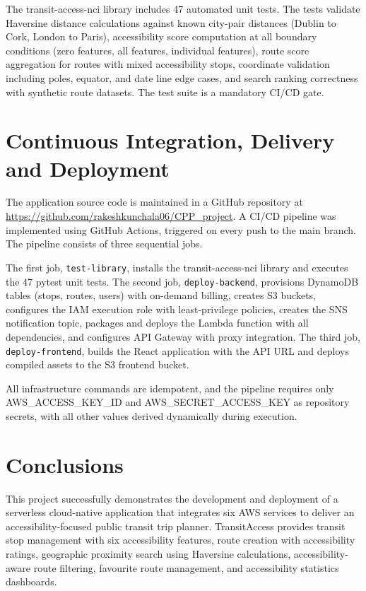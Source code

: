 \documentclass[conference]{IEEEtran}
\begin{document}
The transit-access-nci library includes 47 automated unit tests. The tests validate Haversine distance calculations against known city-pair distances (Dublin to Cork, London to Paris), accessibility score computation at all boundary conditions (zero features, all features, individual features), route score aggregation for routes with mixed accessibility stops, coordinate validation including poles, equator, and date line edge cases, and search ranking correctness with synthetic route datasets. The test suite is a mandatory CI/CD gate.

\section{Continuous Integration, Delivery and Deployment}

The application source code is maintained in a GitHub repository at \url{https://github.com/rakeshkunchala06/CPP\_project}. A CI/CD pipeline was implemented using GitHub Actions, triggered on every push to the main branch. The pipeline consists of three sequential jobs.

The first job, \texttt{test-library}, installs the transit-access-nci library and executes the 47 pytest unit tests. The second job, \texttt{deploy-backend}, provisions DynamoDB tables (stops, routes, users) with on-demand billing, creates S3 buckets, configures the IAM execution role with least-privilege policies, creates the SNS notification topic, packages and deploys the Lambda function with all dependencies, and configures API Gateway with proxy integration. The third job, \texttt{deploy-frontend}, builds the React application with the API URL and deploys compiled assets to the S3 frontend bucket.

All infrastructure commands are idempotent, and the pipeline requires only AWS\_ACCESS\_KEY\_ID and AWS\_SECRET\_ACCESS\_KEY as repository secrets, with all other values derived dynamically during execution.

\section{Conclusions}

This project successfully demonstrates the development and deployment of a serverless cloud-native application that integrates six AWS services to deliver an accessibility-focused public transit trip planner. TransitAccess provides transit stop management with six accessibility features, route creation with accessibility ratings, geographic proximity search using Haversine calculations, accessibility-aware route filtering, favourite route management, and accessibility statistics dashboards.
\end{document}
